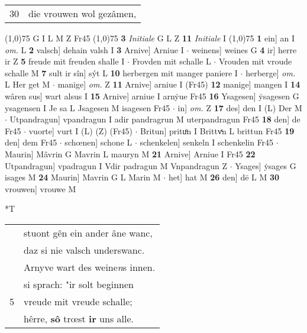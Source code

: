 \documentclass[8pt,a4paper,notitlepage]{article}
\begin{document}
\begin{table}[ht]
\begin{minipage}[t]{0.5\linewidth}
\begin{tabular}{rl}
30 & die vrouwen wol gezâmen,\\ 
\end{tabular}
\scriptsize
\line(1,0){75} \newline
G I L M Z Fr45 \newline
\line(1,0){75} \newline
\textbf{3} \textit{Initiale} G L Z  \textbf{11} \textit{Initiale} I  \newline
\line(1,0){75} \newline
\textbf{1} ein] an I \textit{om.} L \textbf{2} valsch] dehain valsh I \textbf{3} Arnive] Arniue I  $\cdot$ weinens] weines G \textbf{4} ir] herre ir Z \textbf{5} freude mit freuden shalle I  $\cdot$ Frovden mit schalle L  $\cdot$ Vrouden mit vroude schalle M \textbf{7} sult ir sîn] sýt L \textbf{10} herbergen mit manger paniere I  $\cdot$ herberge] \textit{om.} L Her get M  $\cdot$ manige] \textit{om.} Z \textbf{11} Arnive] arniue I (Fr45) \textbf{12} manige] mangen I \textbf{14} wâren sus] wart alsus I \textbf{15} Arnive] arniue I arnẏue Fr45 \textbf{16} Ysagesen] ẏsagesen G ysagensen I Je sa L Jsagesen M isagesen Fr45  $\cdot$ in] \textit{om.} Z \textbf{17} des] den I (L) Der M  $\cdot$ Utpandragun] vpandragun I adir pandragrun M uterpandragun Fr45 \textbf{18} den] de Fr45  $\cdot$ vuorte] vurt I (L) (Z) (Fr45)  $\cdot$ Britun] prituͦn I Brittvͯn L brittun Fr45 \textbf{19} den] dem Fr45  $\cdot$ schœnen] schone L  $\cdot$ schenkelen] senkeln I schenkelin Fr45  $\cdot$ Maurin] Mâvrin G Mavrin L mauryn M \textbf{21} Arnive] Arniue I Fr45 \textbf{22} Utpandragun] vpadragun I Vdir padragun M Vnpandragun Z  $\cdot$ Ysages] ẏsages G isages M \textbf{24} Maurin] Mavrin G L Marin M  $\cdot$ het] hat M \textbf{26} den] dē L M \textbf{30} vrouwen] vrouwe M \newline
\end{minipage}
\hspace{0.5cm}
\begin{minipage}[t]{0.5\linewidth}
\small
\begin{center}*T
\end{center}
\begin{tabular}{rl}
 & stuont gên ein ander âne wanc,\\ 
 & daz si nie valsch underswanc.\\ 
 & Arnyve wart des weine\textit{n}s innen.\\ 
 & si sprach: "ir solt beginnen\\ 
5 & vreude mit vreude schalle;\\ 
 & hêrre, \textbf{sô} trœst \textbf{ir} uns alle.\\ 

\end{tabular}
\end{minipage}
\end{table}
\end{document}
